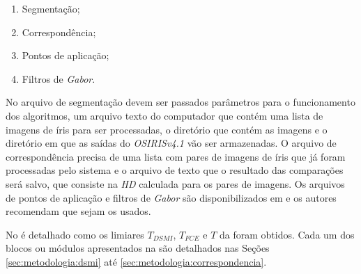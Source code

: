 \begin{enumerate}
    \item Segmentação;
    \item Correspondência;
    \item Pontos de aplicação;
    \item Filtros de \textit{Gabor}.
\end{enumerate}




\par No arquivo de segmentação devem ser passados parâmetros para o funcionamento dos algoritmos, um arquivo texto do computador que contém uma lista de imagens de íris para ser processadas, o diretório que contém as imagens e o diretório em que as saídas do \textit{OSIRISv4.1} vão ser armazenadas. O arquivo de correspondência precisa de uma lista com pares de imagens de íris que já foram processadas pelo sistema e o arquivo de texto que o resultado das comparações será salvo, que consiste na \textit{\acrshort{HD}} calculada para os pares de imagens. Os arquivos de pontos de aplicação e filtros de \textit{Gabor} são disponibilizados em \cite{osirisv41} e os autores recomendam que sejam os usados.

\par No  é detalhado como os limiares $T_{DSMI}$, $T_{FCE}$ e $T$ da  foram obtidos. Cada um dos blocos ou módulos apresentados na  são detalhados nas Seções \ref{sec:metodologia:dsmi} até \ref{sec:metodologia:correspondencia}.



